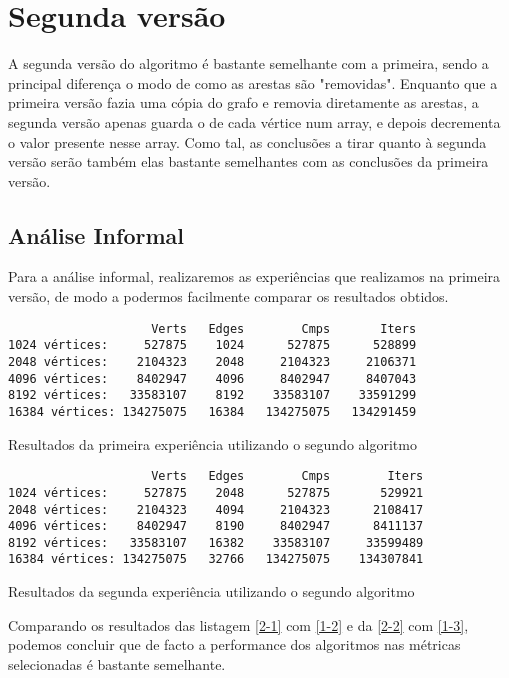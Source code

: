 \chapter{Segunda versão}

A segunda versão do algoritmo é bastante semelhante com a
primeira, sendo a principal diferença o modo de como as
arestas são "removidas". Enquanto que a primeira versão
fazia uma cópia do grafo e removia diretamente as arestas, a
segunda versão apenas guarda o  de cada
vértice num array, e depois decrementa o valor presente
nesse array. Como tal, as conclusões a tirar quanto à
segunda versão serão também elas bastante semelhantes com as
conclusões da primeira versão.


\section{Análise Informal}
Para a análise informal, realizaremos as experiências
que realizamos na primeira versão, de modo a podermos
facilmente comparar os resultados obtidos.

\begin{listing}[H]
	\centering
	\begin{verbatim}
                    Verts	Edges	     Cmps	    Iters
1024 vértices:     527875	 1024	   527875	   528899
2048 vértices:    2104323	 2048	  2104323	  2106371
4096 vértices:    8402947	 4096	  8402947	  8407043
8192 vértices:   33583107	 8192	 33583107	 33591299
16384 vértices: 134275075	16384	134275075	134291459
  \end{verbatim}
	\caption{Resultados da primeira experiência utilizando o segundo algoritmo}
	\label{2-1}
\end{listing}

\begin{listing}[H]
	\centering
	\begin{verbatim}
                    Verts	Edges	     Cmps	     Iters
1024 vértices:     527875	 2048	   527875	    529921
2048 vértices:    2104323	 4094	  2104323	   2108417
4096 vértices:    8402947	 8190	  8402947	   8411137
8192 vértices:   33583107	16382	 33583107	  33599489
16384 vértices: 134275075	32766	134275075	 134307841
  \end{verbatim}
	\caption{Resultados da segunda experiência utilizando o segundo algoritmo}
	\label{2-2}
\end{listing}

Comparando os resultados das listagem \ref{2-1} com \ref{1-2} e da \ref{2-2} com
\ref{1-3}, podemos concluir que de facto a performance dos algoritmos nas
métricas selecionadas é bastante semelhante.

